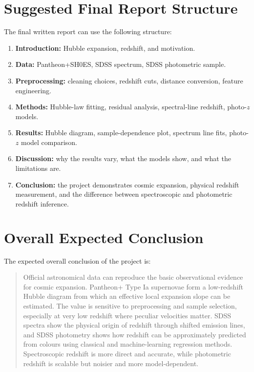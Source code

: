 \documentclass[11pt,a4paper]{article}
\begin{document}
\section{Suggested Final Report Structure}

The final written report can use the following structure:

\begin{enumerate}
    \item \textbf{Introduction:} Hubble expansion, redshift, and motivation.
    \item \textbf{Data:} Pantheon+SH0ES, SDSS spectrum, SDSS photometric sample.
    \item \textbf{Preprocessing:} cleaning choices, redshift cuts, distance conversion, feature engineering.
    \item \textbf{Methods:} Hubble-law fitting, residual analysis, spectral-line redshift, photo-$z$ models.
    \item \textbf{Results:} Hubble diagram, sample-dependence plot, spectrum line fits, photo-$z$ model comparison.
    \item \textbf{Discussion:} why the results vary, what the models show, and what the limitations are.
    \item \textbf{Conclusion:} the project demonstrates cosmic expansion, physical redshift measurement, and the difference between spectroscopic and photometric redshift inference.
\end{enumerate}

\section{Overall Expected Conclusion}

The expected overall conclusion of the project is:

\begin{quote}
Official astronomical data can reproduce the basic observational evidence for cosmic expansion. Pantheon+ Type Ia supernovae form a low-redshift Hubble diagram from which an effective local expansion slope can be estimated. The value is sensitive to preprocessing and sample selection, especially at very low redshift where peculiar velocities matter. SDSS spectra show the physical origin of redshift through shifted emission lines, and SDSS photometry shows how redshift can be approximately predicted from colours using classical and machine-learning regression methods. Spectroscopic redshift is more direct and accurate, while photometric redshift is scalable but noisier and more model-dependent.
\end{quote}
\end{document}
